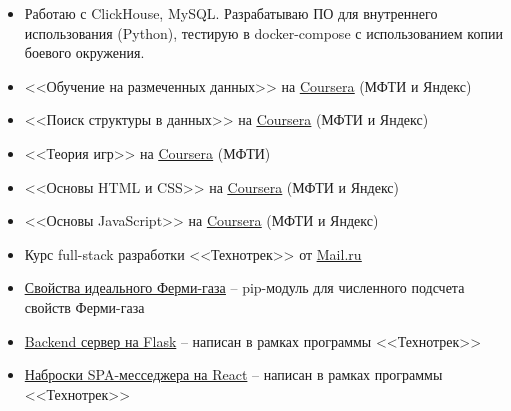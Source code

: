 
\begin{itemize}
    \item Работаю с ClickHouse, MySQL. Разрабатываю ПО для внутреннего использования (Python), тестирую в docker-compose с использованием копии боевого окружения.
\end{itemize}

\begin{itemize}
	\item <<Обучение на размеченных данных>> на \href{https://www.coursera.org/learn/supervised-learning?specialization=machine-learning-data-analysis}{\underline{Coursera}} (МФТИ и Яндекс)
	\item <<Поиск структуры в данных>> на \href{https://www.coursera.org/learn/unsupervised-learning?specialization=machine-learning-data-analysis}{\underline{Coursera}} (МФТИ и Яндекс)
	\item <<Теория игр>> на \href{https://www.coursera.org/learn/gametheory}{\underline{Coursera}} (МФТИ)
	\item <<Основы HTML и CSS>> на \href{https://www.coursera.org/learn/snovy-html-i-css?specialization=razrabotka-interfeysov}{\underline{Coursera}} (МФТИ и Яндекс)
	\item <<Основы JavaScript>> на \href{https://www.coursera.org/learn/javascript-osnovy-i-funktsii}{\underline{Coursera}} (МФТИ и Яндекс)
	\item Курс full-stack разработки <<Технотрек>> от \href{https://track.mail.ru/}{\underline{Mail.ru}}
\end{itemize}


\begin{itemize}
    \item \href{https://github.com/alekseik1/ifg-py}{\underline{Свойства идеального Ферми-газа}} -- pip-модуль для численного подсчета свойств Ферми-газа
    \item \href{https://github.com/alekseik1/tt-ridesharing-backend}{Backend сервер на Flask} -- написан в рамках программы <<Технотрек>>
    \item \href{https://github.com/alekseik1/2018-FS-11-Frontend-Kozharin}{Наброски SPA-месседжера на React} -- написан в рамках программы <<Технотрек>>
\end{itemize}



